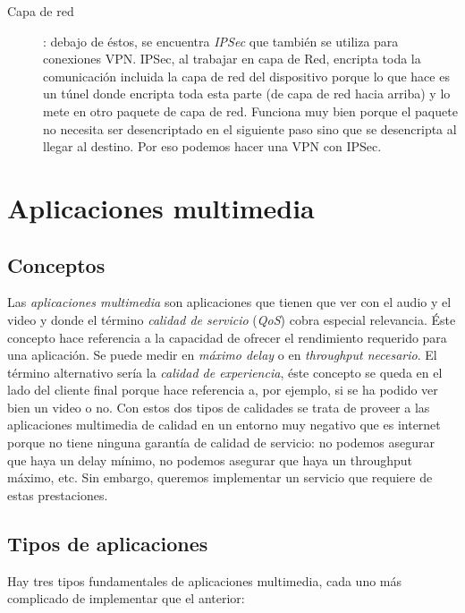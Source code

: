 \documentclass[10pt,a4paper,spanish]{report}
\begin{document}
\begin{description}
  \item[Capa de red]: debajo de éstos, se encuentra \textit{\textcolor{tema2}{IPSec}} que también se utiliza para conexiones VPN. IPSec, al trabajar en capa de Red, encripta toda la comunicación incluida la capa de red del dispositivo porque lo que hace es un túnel donde encripta toda esta parte (de capa de red hacia arriba) y lo mete en otro paquete de capa de red. Funciona muy bien porque el paquete no necesita ser desencriptado en el siguiente paso sino que se desencripta al llegar al destino. Por eso podemos hacer una VPN con IPSec. 
\end{description}

\section{\textcolor{tema2}Aplicaciones multimedia}
\subsection{\textcolor{tema2}Conceptos}
Las \textit{\textcolor{tema2}{aplicaciones multimedia}} son aplicaciones que tienen que ver con el audio y el video y donde el término \textit{\textcolor{tema2}{calidad de servicio}} (\textcolor{tema2}{\textit{QoS}}) cobra especial relevancia. Éste concepto hace referencia a la capacidad de ofrecer el rendimiento requerido para una aplicación. Se puede medir en \textit{\textcolor{tema2}{máximo delay}} o en \textit{\textcolor{tema2}{throughput necesario}}. El término alternativo sería la \textit{\textcolor{tema2}{calidad de experiencia}}, éste concepto se queda en el lado del cliente final porque hace referencia a, por ejemplo, si se ha podido ver bien un video o no. Con estos dos tipos de calidades se trata de proveer a las aplicaciones multimedia de calidad en un entorno muy negativo que es internet porque no tiene ninguna garantía de calidad de servicio: no podemos asegurar que haya un delay mínimo, no podemos asegurar que haya un throughput máximo, etc. Sin embargo, queremos implementar un servicio que requiere de estas prestaciones. 

\subsection{\textcolor{tema2}Tipos de aplicaciones}
Hay tres tipos fundamentales de aplicaciones multimedia, cada uno más complicado de implementar que el anterior:
\end{document}
